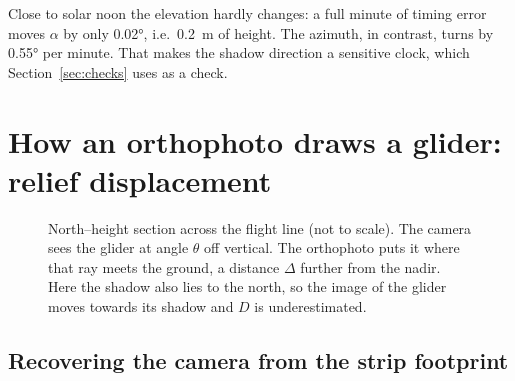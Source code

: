 \documentclass[11pt,a4paper]{article}
\begin{document}
Close to solar noon the elevation hardly changes: a full minute of timing error moves $\alpha$ by only
\ang{0.02}, i.e.\ \SI{0.2}{m} of height. The azimuth, in contrast, turns by \ang{0.55} per minute.
That makes the shadow direction a sensitive clock, which Section~\ref{sec:checks} uses as a check.

\section{How an orthophoto draws a glider: relief displacement}\label{sec:relief}

\begin{figure}[ht]
\centering
{}
\caption{North--height section across the flight line (not to scale). The camera sees the glider
at angle $\theta$ off vertical. The orthophoto puts it where that ray meets the ground, a distance $\Delta$
further from the nadir. Here the shadow also lies to the north, so the image of the glider moves towards its
shadow and $D$ is underestimated.}
\label{fig:relief}
\end{figure}

\subsection{Recovering the camera from the strip footprint}
\end{document}
